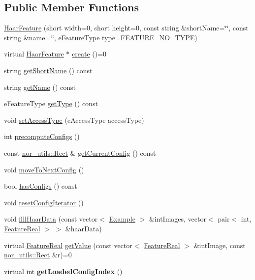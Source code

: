 \subsection*{Public Member Functions}
\begin{DoxyCompactItemize}
\item 
\hyperlink{classMultiBoost_1_1HaarFeature_a8b4550dea5dcdb0396a540cfbd0c2347}{HaarFeature} (short width=0, short height=0, const string \&shortName=\char`\"{}\char`\"{}, const string \&name=\char`\"{}\char`\"{}, eFeatureType type=FEATURE\_\-NO\_\-TYPE)
\item 
virtual \hyperlink{classMultiBoost_1_1HaarFeature}{HaarFeature} $\ast$ \hyperlink{classMultiBoost_1_1HaarFeature_a298d8950cb415b3b54b1ad99f54ea6bb}{create} ()=0
\item 
string \hyperlink{classMultiBoost_1_1HaarFeature_ab1b7caacd7d921ce2d7e98ed971949ba}{getShortName} () const 
\item 
string \hyperlink{classMultiBoost_1_1HaarFeature_a420839cd8a2c3b4d6e0ab5e95f1f8e44}{getName} () const 
\item 
eFeatureType \hyperlink{classMultiBoost_1_1HaarFeature_ac2cd1e0433cf98f251722e1765276e33}{getType} () const 
\item 
void \hyperlink{classMultiBoost_1_1HaarFeature_ac98963f2cd367c07cb187f1f918a5019}{setAccessType} (eAccessType accessType)
\item 
int \hyperlink{classMultiBoost_1_1HaarFeature_a8611eeed1ec900074c23dba2af08912a}{precomputeConfigs} ()
\item 
const \hyperlink{structnor__utils_1_1Rect}{nor\_\-utils::Rect} \& \hyperlink{classMultiBoost_1_1HaarFeature_aca72d175b09b99fd5ce140276b6313e7}{getCurrentConfig} () const 
\item 
void \hyperlink{classMultiBoost_1_1HaarFeature_a27de701185caaff11713083941f9880e}{moveToNextConfig} ()
\item 
bool \hyperlink{classMultiBoost_1_1HaarFeature_aa3c1cdc00b961c91ba547d5f3e2ec98f}{hasConfigs} () const 
\item 
void \hyperlink{classMultiBoost_1_1HaarFeature_aa3d103d556edf183eae94fd732038ad8}{resetConfigIterator} ()
\item 
void \hyperlink{classMultiBoost_1_1HaarFeature_afbb8266424e2ef00ffa2353874ad2582}{fillHaarData} (const vector$<$ \hyperlink{classMultiBoost_1_1Example}{Example} $>$ \&intImages, vector$<$ pair$<$ int, \hyperlink{Defaults_8h_a3a11cfe6a5d469d921716ca6291e934f}{FeatureReal} $>$ $>$ \&haarData)
\item 
virtual \hyperlink{Defaults_8h_a3a11cfe6a5d469d921716ca6291e934f}{FeatureReal} \hyperlink{classMultiBoost_1_1HaarFeature_a57d0ba94269beef5e8ed1ab984bc3099}{getValue} (const vector$<$ \hyperlink{Defaults_8h_a3a11cfe6a5d469d921716ca6291e934f}{FeatureReal} $>$ \&intImage, const \hyperlink{structnor__utils_1_1Rect}{nor\_\-utils::Rect} \&r)=0
\item 
\hypertarget{classMultiBoost_1_1HaarFeature_a7a4768eee4b56bb67f2969d81343fe48}{
virtual int {\bfseries getLoadedConfigIndex} ()}
\label{classMultiBoost_1_1HaarFeature_a7a4768eee4b56bb67f2969d81343fe48}


\end{DoxyCompactItemize}
